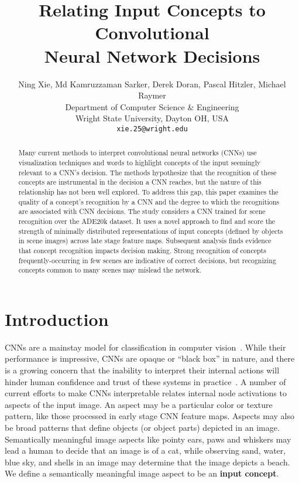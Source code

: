 \documentclass{article}
\title{Relating Input Concepts to Convolutional \\Neural Network Decisions}
\author{
  Ning Xie, Md Kamruzzaman Sarker, Derek Doran, Pascal Hitzler, Michael Raymer\\
  Department of Computer Science \& Engineering\\
  Wright State University, Dayton OH, USA\\
  \texttt{xie.25@wright.edu} \\
}
\begin{document}

\maketitle

\begin{abstract}
Many current methods to interpret convolutional neural
 networks (CNNs) use
visualization techniques and words to highlight
concepts of the input seemingly relevant to a CNN's decision. 
The methods hypothesize that the recognition of these concepts are instrumental in the 
decision a CNN reaches, but the nature of this relationship has not been well
explored. To address this gap, this paper examines the quality of a concept's recognition 
by a CNN and the degree to which the recognitions 
are associated with CNN decisions. The study considers a CNN trained for scene recognition over
the ADE20k dataset. It uses a novel approach to find and score the 
strength of minimally distributed representations of input concepts (defined by objects in scene images) across 
late stage feature maps. Subsequent analysis finds evidence that 
concept recognition impacts decision making. 
Strong recognition of concepts frequently-occurring in few scenes are indicative of 
correct decisions, but recognizing concepts common to many scenes may mislead the network. 
\end{abstract}
 
\section{Introduction}
\label{sec:intro_section}

CNNs are a mainstay model for classification  
in computer vision~\citep{lecun1998gradient,girshick2014rich,ren2015faster,simonyan2014very,sun2014deep}.
While their performance is impressive, CNNs are 
opaque or ``black box'' in nature, and there is a growing concern that the inability to interpret 
their internal actions will hinder human confidence and
trust of these systems in practice~\citep{lipton16, doran17}. 
A number of current efforts to make CNNs interpretable relates internal node activations to 
aspects of the input image. An aspect may be a particular color or texture pattern,
like those processed in early stage CNN feature maps. Aspects
may also be broad patterns that define objects (or object parts) 
depicted in an image. Semantically meaningful image aspects like
pointy ears, paws and whiskers may 
lead a human to decide that an image is of a cat, while observing 
sand, water, blue sky, and shells in an image may
determine that the image depicts a beach. We define a semantically meaningful image aspect to 
be an {\bf input concept}. 
\end{document}
